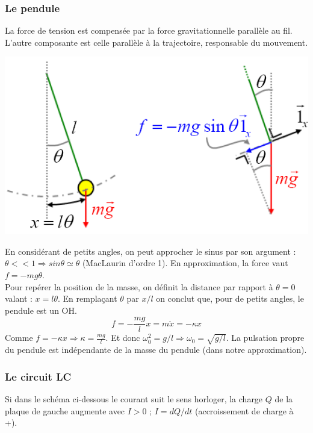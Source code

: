 \documentclass	[11pt, a4paper, openany]{book}
\begin{document}
	\subsubsection{Le pendule}
	La force de tension est compensée par la force gravitationnelle parallèle au fil. L'autre composante  est celle parallèle à la trajectoire, responsable du mouvement.
	\begin{center}
		\includegraphics[scale=0.45]{oo/image5.png}
	\end{center}
	En considérant de petits angles, on peut approcher le sinus par son argument : $\theta << 1 \Rightarrow sin\theta \simeq \theta$ (MacLaurin d'ordre 1). En approximation, la force vaut $f = -mg\theta$.\\
	
	Pour repérer la position de la masse, on définit la distance par rapport à $\theta = 0$ valant : $x = l\theta$. En remplaçant $\theta$ par $x/l$ on conclut que, pour de petits angles, le pendule est un OH.
	\begin{equation}
		f = -\frac{mg}{l}x = m\ddot{x} = -\kappa x
	\end{equation}
	Comme $f = -\kappa x \Rightarrow \kappa = \frac{mg}{l}$. Et donc $\omega_0^2 = g/l \Rightarrow \omega_0 = \sqrt{g/l}$. La pulsation propre du pendule est indépendante de la masse du pendule (dans notre approximation).
	
	\subsubsection{Le circuit LC}
	Si dans le schéma ci-dessous le courant suit le sens horloger, la charge $Q$ de la plaque de gauche augmente avec $I > 0$ ; $I = dQ/dt$ (accroissement de charge à +).
	
\end{document}
